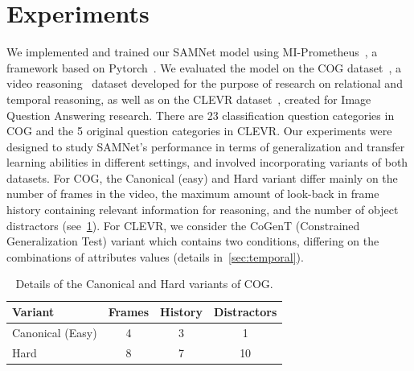 \section{Experiments}
\label{sec:experiments}
We implemented and trained our SAMNet model using MI-Prometheus~\cite{kornuta2018accelerating}, a framework based on Pytorch~\cite{paszke2017automatic}. 
We evaluated the model on the COG dataset~\cite{yang2018dataset}, a video reasoning~\cite{mogadala2019trends} dataset developed for the purpose of research on relational and temporal reasoning, as well as on the CLEVR dataset~\cite{johnson2017clevr}, created for Image Question Answering research.
There are 23 classification question categories in COG and the 5 original question categories in CLEVR.
Our experiments were designed to study SAMNet's performance in terms of generalization and transfer learning abilities in different settings,
and involved incorporating variants of both datasets.  
For COG, the Canonical (easy) and Hard variant differ mainly on the number of frames in the video, 
the maximum amount of look-back in frame history containing relevant information for reasoning, 
and the number of object distractors (see~\cref{tab:cog_variants}).
For CLEVR, we consider the CoGenT (Constrained Generalization Test) variant which contains two conditions, differing on the combinations of attributes values (details in~\cref{sec:temporal}).
\begin{table}[ht]
	\centering
		\begin{tabular}{lccc}
			\toprule
			Variant	& Frames & History	& Distractors \\ 
			\midrule
			Canonical (Easy) & 4 & 3 & 1\\	
			Hard  & 8 & 7 & 10\\
			\bottomrule	
		\end{tabular}
	\caption{Details of the Canonical and Hard variants of COG.}
	\label{tab:cog_variants}
\end{table}\vspace{5pt}


